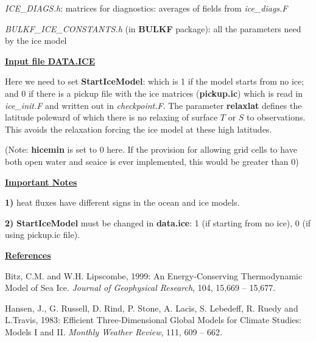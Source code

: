 \noindent
{\it ICE\_DIAGS.h}: matrices for diagnostics: averages of fields
from {\it ice\_diags.F}

\noindent
{\it BULKF\_ICE\_CONSTANTS.h} (in {\bf BULKF} package): 
all the parameters need by the ice model

\vspace{1cm}

\noindent
{\bf {\underline{Input file DATA.ICE}}}

\noindent
Here we need to set {\bf StartIceModel}: which is 1 if the
model starts from no ice; and 0 if there is a pickup file
with the ice matrices ({\bf pickup.ic}) which is read
in {\it ice\_init.F} and written out in {\it checkpoint.F}.
The parameter {\bf relaxlat} defines the latitude poleward
of which there is no relaxing of surface $T$ or $S$ to
observations. This avoids the relaxation forcing the ice
model at these high latitudes.

\noindent
({\tiny Note: {\bf hicemin} is set to 0 here. If the
provision for allowing grid cells to have both
open water and seaice is ever implemented, this would
be greater than 0})

\vspace{1cm}

\noindent
{\bf {\underline{Important Notes}}}

\noindent
{\bf 1)} heat fluxes have different signs in the ocean and ice
models.

\noindent
{\bf 2)} {\bf StartIceModel} must be changed in {\bf data.ice}:
1 (if starting from no ice), 0 (if using pickup.ic file).


\vspace{1cm}

\noindent 
{\bf {\underline{References}}}

\noindent
Bitz, C.M. and W.H. Lipscombe, 1999: An Energy-Conserving
Thermodynamic Model of Sea Ice.
{\it Journal of Geophysical Research}, 104, 15,669 -- 15,677.

\vspace{.2cm}

\noindent
Hansen, J., G. Russell, D. Rind, P. Stone, A. Lacis, S. Lebedeff,
R. Ruedy and L.Travis, 1983: Efficient Three-Dimensional
Global Models for Climate Studies: Models I and II.
{\it Monthly Weather Review}, 111, 609 -- 662.

